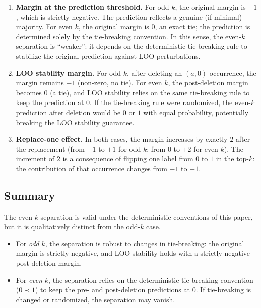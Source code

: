 \begin{enumerate}[leftmargin=*,label=(\arabic*)]

\item \textbf{Margin at the prediction threshold.}
For odd $k$, the original margin is $-1$, which is strictly negative. The
prediction reflects a genuine (if minimal) majority. For even $k$, the
original margin is $0$, an exact tie; the prediction is determined solely
by the tie-breaking convention. In this sense, the even-$k$ separation is
``weaker'': it depends on the deterministic tie-breaking rule to stabilize
the original prediction against LOO perturbations.

\item \textbf{LOO stability margin.}
For odd $k$, after deleting an $(a,0)$ occurrence, the margin remains $-1$
(non-zero, no tie). For even $k$, the post-deletion margin becomes $0$
(a tie), and LOO stability relies on the same tie-breaking rule to keep the
prediction at $0$. If the tie-breaking rule were randomized, the even-$k$
prediction after deletion would be $0$ or $1$ with equal probability,
potentially breaking the LOO stability guarantee.

\item \textbf{Replace-one effect.}
In both cases, the margin
increases by exactly $2$ after the replacement (from $-1$ to $+1$ for odd
$k$; from $0$ to $+2$ for even $k$). The increment of $2$ is a consequence of
flipping one label from $0$ to $1$ in the top-$k$: the contribution of that
occurrence changes from $-1$ to $+1$.

\end{enumerate}

\subsection{Summary}
\label{sec:even-k-summary}

The even-$k$ separation is valid under the deterministic conventions of this
paper, but it is qualitatively distinct from the odd-$k$ case.

\begin{itemize}
\item For {\em odd} $k$, the separation is robust to changes in tie-breaking:
  the original margin is strictly negative, and LOO stability holds with a
  strictly negative post-deletion margin.
\item For {\em even} $k$, the separation relies on the deterministic
  tie-breaking convention ($0\prec 1$) to keep the pre- and post-deletion
  predictions at $0$. If tie-breaking is changed or randomized, the
  separation may vanish.
\end{itemize}

